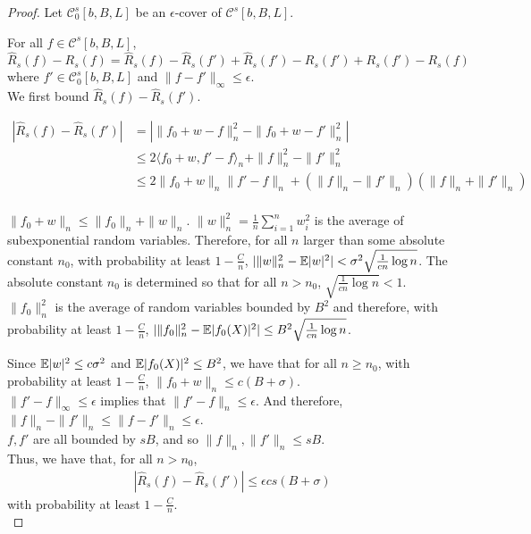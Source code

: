 \documentclass{article}
\begin{document}
\begin{proof}

Let $\mathcal{C}_0^{s}[b,B,L]$ be an $\epsilon$-cover of $\mathcal{C}^s[b,B,L]$. 

For all $f \in \mathcal{C}^s[b,B,L]$,
\[
\hat{R}_s(f) - R_s(f) = \hat{R}_s(f) - \hat{R}_s(f') + \hat{R}_s(f') - R_s(f') + R_s(f') - R_s(f)
\]
where $f' \in \mathcal{C}_0^s[b,B,L]$ and $\| f - f' \|_\infty \leq \epsilon$.\\

We first bound $\hat{R}_s(f) - \hat{R}_s(f')$.

\begin{align*}
|\hat{R}_s(f) - \hat{R}_s(f')| &= |\| f_0 + w - f \|_n^2 - \| f_0 + w - f' \|_n^2| \\
	&\leq 2 \langle f_0 + w , f' - f \rangle_n + \| f \|_n^2 - \| f' \|_n^2\\
	&\leq 2 \| f_0 + w \|_n \| f' - f \|_n + ( \| f \|_n - \|f'\|_n)( \| f \|_n + \|f'\|_n)\\
\end{align*}

$\| f_0 + w \|_n \leq \| f_0 \|_n + \|w \|_n$. $\| w \|^2_n = \frac{1}{n}\sum_{i=1}^n w_i^2$ is the average of subexponential random variables. Therefore, for all $n$ larger than some absolute constant $n_0$, with probability at least $1-\frac{C}{n}$, $|\|w\|^2_n - \mathbb{E}|w|^2 | < \sigma^2 \sqrt{\frac{1}{cn} \log n}$. The absolute constant $n_0$ is determined so that for all $n > n_0$, $\sqrt{\frac{1}{cn} \log n} < 1$. \\

$\|f_0\|^2_n$ is the average of random variables bounded by $B^2$ and therefore, with probability at least $1-\frac{C}{n}$, $|\| f_0 \|^2_n - \mathbb{E} |f_0(X)|^2 | \leq B^2\sqrt{ \frac{1}{cn} \log n}$.

Since $\mathbb{E}|w|^2 \leq c\sigma^2$ and $\mathbb{E}| f_0(X)|^2 \leq B^2$, we have that for all $n \geq n_0$, with probability at least $1-\frac{C}{n}$, $\| f_0 + w \|_n \leq c(B+\sigma)$.\\

$\| f' - f \|_\infty \leq \epsilon$ implies that $\| f' - f\|_n \leq \epsilon$. And therefore, $\| f \|_n - \|f'\|_n \leq \| f - f' \|_n \leq \epsilon$. \\

$f,f'$ are all bounded by $sB$, and so $\|f \|_n, \| f' \|_n \leq sB$.\\

Thus, we have that, for all $n > n_0$,
\begin{align}
|\hat{R}_s(f) - \hat{R}_s(f')| \leq \epsilon cs(B + \sigma) \label{eqn:approx_deviation1}
\end{align}
with probability at least $1-\frac{C}{n}$.\\


\end{proof}
\end{document}
